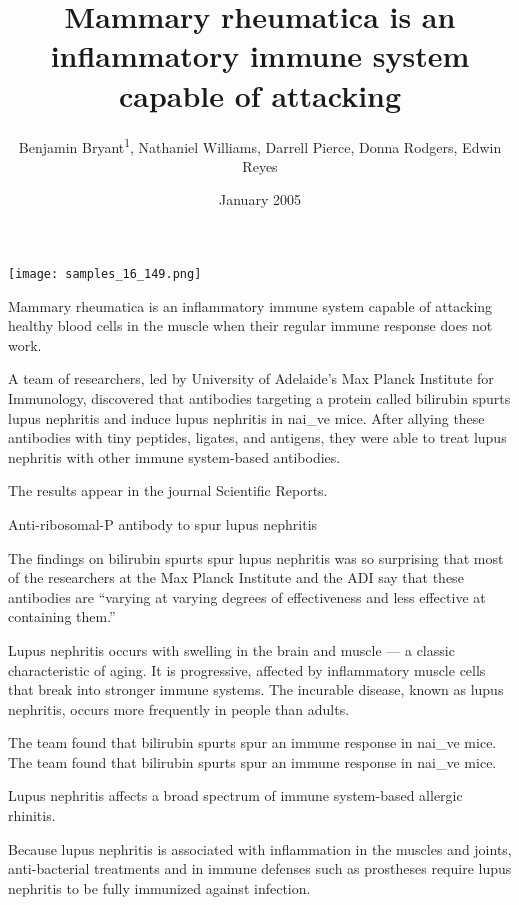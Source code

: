 \documentclass{article}
\title{Mammary rheumatica is an inflammatory immune system capable of attacking}
\author{Benjamin Bryant\textsuperscript{1},  Nathaniel Williams,  Darrell Pierce,  Donna Rodgers,  Edwin Reyes}
\affil{\textsuperscript{1}University Hospital Erlangen}
\date{January 2005}
\begin{document}
\maketitle

\begin{center}
\begin{minipage}{0.75\linewidth}
\texttt{[image: samples\_16\_149.png]}
\end{minipage}
\end{center}

Mammary rheumatica is an inflammatory immune system capable of attacking healthy blood cells in the muscle when their regular immune response does not work.

A team of researchers, led by University of Adelaide’s Max Planck Institute for Immunology, discovered that antibodies targeting a protein called bilirubin spurts lupus nephritis and induce lupus nephritis in nai\_ve mice. After allying these antibodies with tiny peptides, ligates, and antigens, they were able to treat lupus nephritis with other immune system-based antibodies.

The results appear in the journal Scientific Reports.

Anti-ribosomal-P antibody to spur lupus nephritis

The findings on bilirubin spurts spur lupus nephritis was so surprising that most of the researchers at the Max Planck Institute and the ADI say that these antibodies are “varying at varying degrees of effectiveness and less effective at containing them.”

Lupus nephritis occurs with swelling in the brain and muscle — a classic characteristic of aging. It is progressive, affected by inflammatory muscle cells that break into stronger immune systems. The incurable disease, known as lupus nephritis, occurs more frequently in people than adults.

The team found that bilirubin spurts spur an immune response in nai\_ve mice. The team found that bilirubin spurts spur an immune response in nai\_ve mice.

Lupus nephritis affects a broad spectrum of immune system-based allergic rhinitis.

Because lupus nephritis is associated with inflammation in the muscles and joints, anti-bacterial treatments and in immune defenses such as prostheses require lupus nephritis to be fully immunized against infection.
\end{document}
